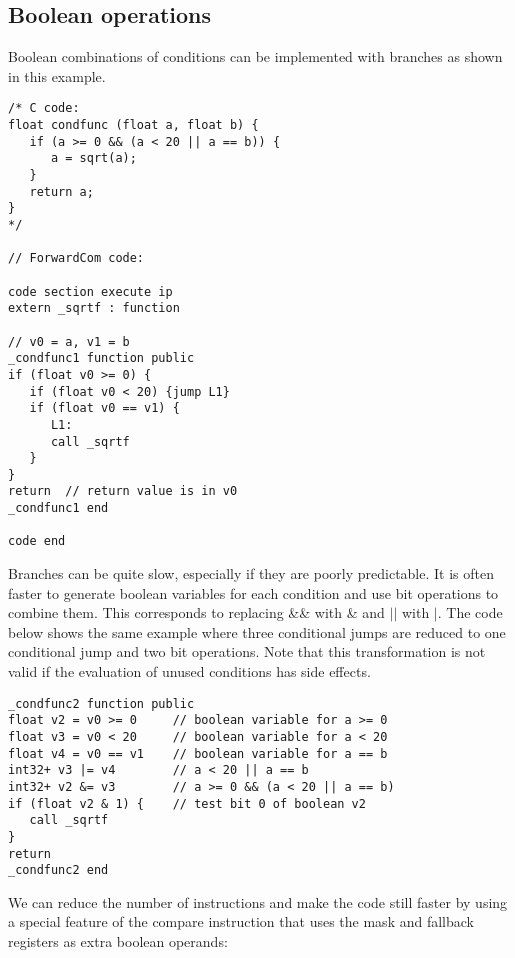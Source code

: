 \documentclass[forwardcom.tex]{subfiles}
\begin{document}
\subsection{Boolean operations} \label{BooleanOperations}
Boolean combinations of conditions can be implemented with branches as shown in this example.
\vv

\begin{example}
\label{exampleBooleanOperations1}
\end{example}
\begin{lstlisting}[frame=single]
/* C code:
float condfunc (float a, float b) {
   if (a >= 0 && (a < 20 || a == b)) {
      a = sqrt(a);
   }
   return a;
}
*/

// ForwardCom code:

code section execute ip
extern _sqrtf : function

// v0 = a, v1 = b
_condfunc1 function public
if (float v0 >= 0) {
   if (float v0 < 20) {jump L1}
   if (float v0 == v1) {
      L1:
      call _sqrtf
   }
}
return  // return value is in v0
_condfunc1 end

code end
\end{lstlisting}
\vspace{4mm}

Branches can be quite slow, especially if they are poorly predictable. 
It is often faster to generate boolean variables for each condition and use bit operations to combine them. 
This corresponds to replacing \&\& with \& and $\vert\vert$ with $\vert$. 
The code below shows the same example where three conditional jumps are reduced to one conditional jump and two bit operations.
Note that this transformation is not valid if the evaluation of unused conditions has side effects.

\begin{example}
\label{exampleBooleanOperations2}
\end{example}
\begin{lstlisting}[frame=single]
_condfunc2 function public
float v2 = v0 >= 0     // boolean variable for a >= 0
float v3 = v0 < 20     // boolean variable for a < 20
float v4 = v0 == v1    // boolean variable for a == b
int32+ v3 |= v4        // a < 20 || a == b
int32+ v2 &= v3        // a >= 0 && (a < 20 || a == b)
if (float v2 & 1) {    // test bit 0 of boolean v2
   call _sqrtf
}
return
_condfunc2 end
\end{lstlisting}
\vspace{4mm}

We can reduce the number of instructions and make the code still faster by using a special feature of the compare instruction that uses the mask and fallback registers as extra boolean operands:
\end{document}
